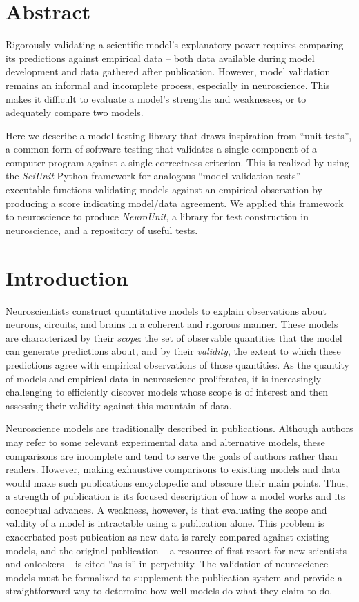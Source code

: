 \documentclass[11pt,letterpaper]{article}
\begin{document}
\section{Abstract}
Rigorously validating a scientific model’s explanatory power requires comparing its predictions against empirical data -- both data available during model development and data gathered after publication. 
However, model validation remains an informal and incomplete process, especially in neuroscience.   
This makes it difficult to evaluate a model's strengths and weaknesses, or to adequately compare two models.

Here we describe a model-testing library that draws inspiration from ``unit tests'', a common form of software testing that validates a single component of a computer program against a single correctness criterion. 
This is realized by using the \textit{SciUnit} Python framework for analogous ``model validation tests'' -- 
executable functions validating models against an empirical observation by producing a score indicating model/data agreement. 
We applied this framework to neuroscience to produce \textit{NeuroUnit}, a library for test construction in neuroscience, and a repository of useful tests.  

\section{Introduction}
Neuroscientists construct quantitative models to explain observations about neurons, circuits, and brains in a coherent and rigorous manner. 
These models are characterized by their \textit{scope}: the set of observable quantities that the model can generate predictions about, and by their \textit{validity}, the extent to which these predictions agree with empirical observations of those quantities. 
As the quantity of models and empirical data in neuroscience proliferates, it is increasingly challenging to efficiently discover models whose scope is of interest and then assessing their validity against this mountain of data. 

Neuroscience models are traditionally described in publications. 
Although authors may refer to some relevant experimental data and alternative models, these comparisons are incomplete and tend to serve the goals of authors rather than readers. 
However, making exhaustive comparisons to exisiting models and data would make such publications encyclopedic and obscure their main points. 
Thus, a strength of publication is its focused description of how a model works and its conceptual advances. 
A weakness, however, is that evaluating the scope and validity of a model is intractable using a publication alone. 
This problem is exacerbated post-pubication as new data is rarely compared against existing models, and the original publication -- a resource of first resort for new scientists and onlookers -- is cited ``as-is'' in perpetuity. 	
The validation of neuroscience models must be formalized to supplement the publication system and provide a straightforward way to determine how well models do what they claim to do.  
\end{document}
